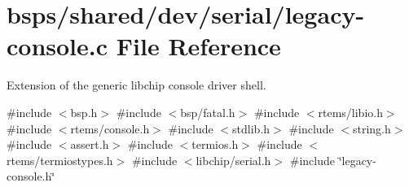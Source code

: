 \hypertarget{legacy-console_8c}{}\section{bsps/shared/dev/serial/legacy-\/console.c File Reference}
\label{legacy-console_8c}


Extension of the generic libchip console driver shell.  


{\ttfamily \#include $<$bsp.\+h$>$}\newline
{\ttfamily \#include $<$bsp/fatal.\+h$>$}\newline
{\ttfamily \#include $<$rtems/libio.\+h$>$}\newline
{\ttfamily \#include $<$rtems/console.\+h$>$}\newline
{\ttfamily \#include $<$stdlib.\+h$>$}\newline
{\ttfamily \#include $<$string.\+h$>$}\newline
{\ttfamily \#include $<$assert.\+h$>$}\newline
{\ttfamily \#include $<$termios.\+h$>$}\newline
{\ttfamily \#include $<$rtems/termiostypes.\+h$>$}\newline
{\ttfamily \#include $<$libchip/serial.\+h$>$}\newline
{\ttfamily \#include \char`\"{}legacy-\/console.\+h\char`\"{}}\newline
